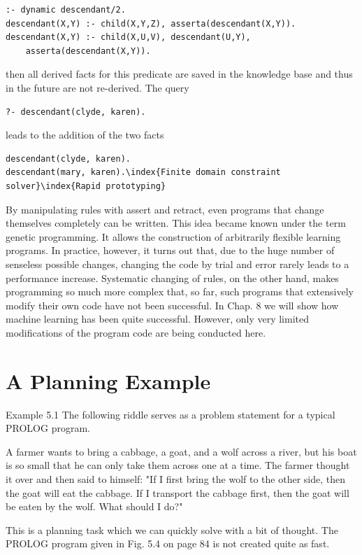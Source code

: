 \documentclass[10pt]{book}
\begin{document}
\begin{verbatim}
:- dynamic descendant/2.
descendant(X,Y) :- child(X,Y,Z), asserta(descendant(X,Y)).
descendant(X,Y) :- child(X,U,V), descendant(U,Y),
    asserta(descendant(X,Y)).
\end{verbatim}

then all derived facts for this predicate are saved in the knowledge base and thus in the future are not re-derived. The query

\begin{verbatim}
?- descendant(clyde, karen).
\end{verbatim}

leads to the addition of the two facts

\begin{verbatim}
descendant(clyde, karen).
descendant(mary, karen).\index{Finite domain constraint solver}\index{Rapid prototyping}
\end{verbatim}

By manipulating rules with assert and retract, even programs that change themselves completely can be written. This idea became known under the term genetic programming. It allows the construction of arbitrarily flexible learning programs. In practice, however, it turns out that, due to the huge number of senseless possible changes, changing the code by trial and error rarely leads to a performance increase. Systematic changing of rules, on the other hand, makes programming so much more complex that, so far, such programs that extensively modify their own code have not been successful. In Chap. 8 we will show how machine learning has been quite successful. However, only very limited modifications of the program code are being conducted here.

\section{A Planning Example}
Example 5.1 The following riddle serves as a problem statement for a typical PROLOG program.

A farmer wants to bring a cabbage, a goat, and a wolf across a river, but his boat is so small that he can only take them across one at a time. The farmer thought it over and then said to himself: "If I first bring the wolf to the other side, then the goat will eat the cabbage. If I transport the cabbage first, then the goat will be eaten by the wolf. What should I do?"

This is a planning task which we can quickly solve with a bit of thought. The PROLOG program given in Fig. 5.4 on page 84 is not created quite as fast.
\end{document}
